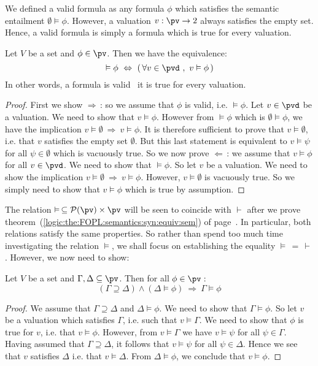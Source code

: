 We defined a valid formula as any formula $\phi$ which satisfies the
semantic entailment $\emptyset\vDash\phi$. However, a valuation
$v:\pv\to 2$ always satisfies the empty set. Hence, a valid formula
is simply a formula which is true for every valuation.

\begin{prop}\label{logic:prop:FOPL:semantics:validity:charac}
Let $V$ be a set and $\phi\in\pv$. Then we have the equivalence:
    \[
    \vDash\phi\ \Leftrightarrow\ (\,\forall v\in\pvd\ ,\ v\vDash\phi\,)
    \]
In other words, a formula is valid \ifand\ it is true for every
valuation.
\end{prop}
\begin{proof}
First we show $\Rightarrow$\,: so we assume that $\phi$ is valid,
i.e. $\vDash\phi$. Let $v\in\pvd$ be a valuation. We need to show
that $v\vDash\phi$. However from $\vDash\phi$ which is
$\emptyset\vDash\phi$, we have the implication $v\vDash\emptyset\
\Rightarrow\ v\vDash\phi$. It is therefore sufficient to prove that
$v\vDash\emptyset$, i.e. that $v$ satisfies the empty set
$\emptyset$. But this last statement is equivalent to $v\vDash\psi$
for all $\psi\in\emptyset$ which is vacuously true. So we now prove
$\Leftarrow$\,: we assume that $v\vDash\phi$ for all $v\in\pvd$. We
need to show that $\vDash\phi$. So let $v$ be a valuation. We need
to show the implication $v\vDash\emptyset\ \Rightarrow\
v\vDash\phi$. However, $v\vDash\emptyset$ is vacuously true. So we
simply need to show that $v\vDash\phi$ which is true by assumption.
\end{proof}

The relation $\vDash\,\subseteq{\cal P}(\pv)\times\pv$ will be seen
to coincide with $\vdash$ after we prove
theorem~(\ref{logic:the:FOPL:semantics:syn:equiv:sem}) of
page~\pageref{logic:the:FOPL:semantics:syn:equiv:sem}. In
particular, both relations satisfy the same properties. So rather
than spend too much time investigating the relation $\vDash$, we
shall focus on establishing the equality $\vDash\,=\,\vdash$.
However, we now need to show:
\begin{prop}\label{logic:def:FOPL:semantics:monotonicity}
Let $V$ be a set and $\Gamma,\Delta\subseteq\pv$. Then for all
$\phi\in\pv$\,:
    \[
    (\Gamma\supseteq\Delta)\land(\Delta\vDash\phi)\ \Rightarrow\
    \Gamma\vDash\phi
    \]
\end{prop}
\begin{proof}
We assume that $\Gamma\supseteq\Delta$ and $\Delta\vDash\phi$. We
need to show that $\Gamma\vDash\phi$. So let $v$ be a valuation
which satisfies $\Gamma$, i.e. such that $v\vDash\Gamma$. We need to
show that $\phi$ is true for $v$, i.e. that $v\vDash\phi$. However,
from $v\vDash\Gamma$ we have $v\vDash\psi$ for all $\psi\in\Gamma$.
Having assumed that $\Gamma\supseteq\Delta$, it follows that
$v\vDash\psi$ for all $\psi\in\Delta$. Hence we see that $v$
satisfies $\Delta$ i.e. that $v\vDash\Delta$. From
$\Delta\vDash\phi$, we conclude that $v\vDash\phi$.
\end{proof}

